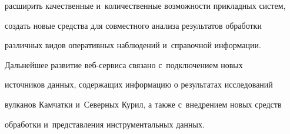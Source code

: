 расширить качественные и~количественные возможности прикладных систем, 


создать новые средства для совместного анализа результатов обработки 


различных видов оперативных наблюдений и~справочной информации.


     


     Дальнейшее развитие веб-сервиса связано с~подключением новых 


источников данных, содержащих информацию о результатах исследований 


вулканов Камчатки и~Северных Курил, а также с~внедрением новых средств 


обработки и~представления инструментальных данных. 





